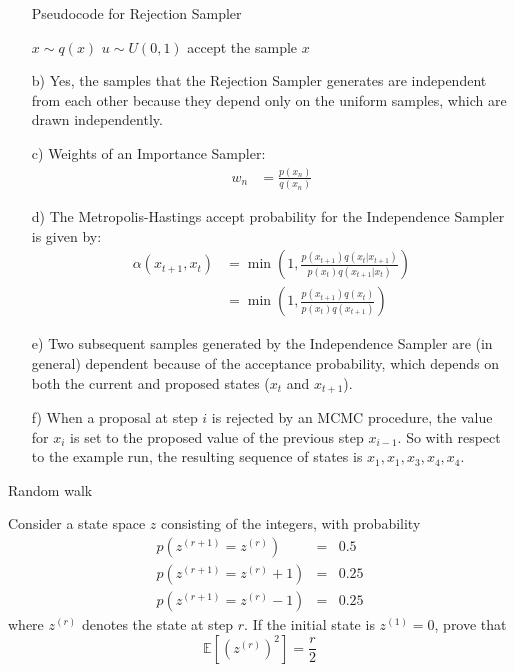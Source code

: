 \documentclass{amsmlaj}
\begin{document}
\begin{problem}
\begin{sol}
\begin{itemize}
\begin{center}
				\begin{minipage}{.7\linewidth}
					\begin{algorithm}[H]
						\DontPrintSemicolon
						\SetNlSty{}{}{:}
						\caption{Pseudocode for Rejection Sampler}
						$x \sim q(x)$\;
						$u \sim U(0, 1)$\;
						 {
							accept the sample $x$\;
						}
					\end{algorithm}
				\end{minipage}
			\end{center}
		\item[b)] Yes, the samples that the Rejection Sampler generates are
			independent from each other because they depend only on the uniform
			samples, which are drawn independently.
		\item[c)] Weights of an Importance Sampler:
			\begin{align}
				w_n&=\frac{p(x_n)}{q(x_n)}
			\end{align}
		\item[d)] The Metropolis-Hastings accept probability for the Independence
			Sampler is given by:
			\begin{align}
				\alpha(x_{t+1},x_t)&=\min\left(
					1,\frac{p(x_{t+1})q(x_t|x_{t+1})}{p(x_t)q(x_{t+1}|x_t)}
				\right) \\
				&=\min\left(
					1,\frac{p(x_{t+1})q(x_t)}{p(x_t)q(x_{t+1})}
				\right)
			\end{align}
		\item[e)] Two subsequent samples generated by the Independence Sampler
			are (in general) dependent because of the acceptance
			probability, which depends on both the current and proposed states
			($x_t$ and $x_{t+1}$).
		\item[f)] When a proposal at step $i$ is rejected by an MCMC procedure, the
			value for $x_i$ is set to the proposed value of the previous step
			$x_{i-1}$. So with respect to the example run, the resulting
			sequence of states is $x_1, x_1, x_3, x_4, x_4$.
	\end{itemize}
\end{sol}

\end{problem}


\begin{problem}\textsf{Random walk}

Consider a state space $z$ consisting of the integers, with probability
\begin{eqnarray}
p(z^{(r+1)} = z^{(r)}) & = & 0.5 \nonumber \\
p(z^{(r+1)} = z^{(r)}+1) & = & 0.25 \nonumber \\
p(z^{(r+1)} = z^{(r)}-1) & = & 0.25 \nonumber 
\end{eqnarray}
where $z^{(r)}$ denotes the state at step $r$. If the initial state is $z^{(1)}=0$, prove that 
$$
\mathbb{E}\left[(z^{(r)})^2\right]=\frac{r}{2}
$$

\end{problem}
\end{document}
